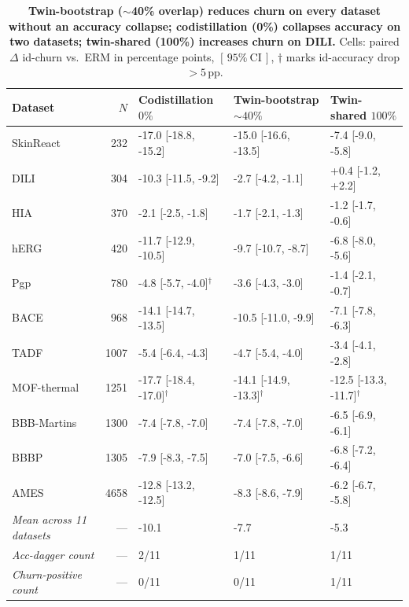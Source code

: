 \begin{table}[h]
  \centering
  \caption{\textbf{\boldmath Twin-bootstrap ($\sim$40\% overlap) reduces churn on every dataset without an accuracy collapse; codistillation (0\%) collapses accuracy on two datasets; twin-shared (100\%) increases churn on DILI.}  Cells: paired $\Delta$ id-churn vs.\ ERM in percentage points, $[\,95\%\ \text{CI}\,]$, $\dagger$ marks id-accuracy drop $>5$\,pp.}
  \label{tab:overlap_spectrum}
  \small
  \begin{tabular}{lrlll}
    \toprule
    Dataset & $N$ & Codistillation $0\%$ & Twin-bootstrap ${\sim}40\%$ & Twin-shared $100\%$ \\
    \midrule
    SkinReact & 232 & -17.0 [-18.8, -15.2] & -15.0 [-16.6, -13.5] & -7.4 [-9.0, -5.8] \\
    DILI & 304 & -10.3 [-11.5, -9.2] & -2.7 [-4.2, -1.1] & +0.4 [-1.2, +2.2] \\
    HIA & 370 & -2.1 [-2.5, -1.8] & -1.7 [-2.1, -1.3] & -1.2 [-1.7, -0.6] \\
    hERG & 420 & -11.7 [-12.9, -10.5] & -9.7 [-10.7, -8.7] & -6.8 [-8.0, -5.6] \\
    Pgp & 780 & -4.8 [-5.7, -4.0]$^\dagger$ & -3.6 [-4.3, -3.0] & -1.4 [-2.1, -0.7] \\
    BACE & 968 & -14.1 [-14.7, -13.5] & -10.5 [-11.0, -9.9] & -7.1 [-7.8, -6.3] \\
    TADF & 1007 & -5.4 [-6.4, -4.3] & -4.7 [-5.4, -4.0] & -3.4 [-4.1, -2.8] \\
    MOF-thermal & 1251 & -17.7 [-18.4, -17.0]$^\dagger$ & -14.1 [-14.9, -13.3]$^\dagger$ & -12.5 [-13.3, -11.7]$^\dagger$ \\
    BBB-Martins & 1300 & -7.4 [-7.8, -7.0] & -7.4 [-7.8, -7.0] & -6.5 [-6.9, -6.1] \\
    BBBP & 1305 & -7.9 [-8.3, -7.5] & -7.0 [-7.5, -6.6] & -6.8 [-7.2, -6.4] \\
    AMES & 4658 & -12.8 [-13.2, -12.5] & -8.3 [-8.6, -7.9] & -6.2 [-6.7, -5.8] \\
    \midrule
    \emph{Mean across 11 datasets} & --- & -10.1 & -7.7 & -5.3 \\
    \emph{Acc-dagger count} & --- & 2/11 & 1/11 & 1/11 \\
    \emph{Churn-positive count} & --- & 0/11 & 0/11 & 1/11 \\
    \bottomrule
  \end{tabular}
\end{table}
